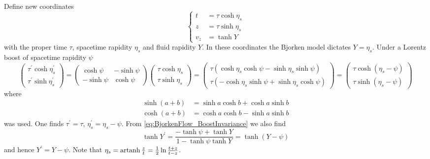 Define new coordinates
\begin{equation}
    \left\{
    \begin{split}
        t&=\tau\cosh\eta_s\\
        z&=\tau\sinh\eta_s\\
        v_z&=\tanh Y
    \end{split}
    \right.
\end{equation}
with the proper time $\tau$, spacetime rapidity $\eta_s$ and fluid rapidity $Y$. In these coordinates the Bjorken model dictates $Y=\eta_s$. Under a Lorentz boost of spacetime rapidity $\psi$
\begin{equation}
    \begin{pmatrix}
        \tau^\prime\cosh\eta_s^\prime \\
        \tau^\prime\sinh\eta_s^\prime
    \end{pmatrix}
    =
    \begin{pmatrix}
        \cosh\psi  & -\sinh\psi \\
        -\sinh\psi & \cosh\psi
    \end{pmatrix}
    \begin{pmatrix}
        \tau\cosh\eta_s \\
        \tau\sinh\eta_s
    \end{pmatrix}
    =
    \begin{pmatrix}
        \tau(\cosh\eta_s\cosh\psi-\sinh\eta_s\sinh\psi) \\
        \tau(-\cosh\eta_s\sinh\psi+\sinh\eta_s\cosh\psi)
    \end{pmatrix}
    =
    \begin{pmatrix}
        \tau\cosh(\eta_s-\psi) \\
        \tau\sinh(\eta_s-\psi)
    \end{pmatrix}
\end{equation}
where
\begin{subequations}
    \begin{align}
        \sinh(a+b) & =\sinh a\cosh b+\cosh a\sinh b \\
        \cosh(a+b) & =\cosh a\cosh b-\sinh a\sinh b
    \end{align}
\end{subequations}
was used. One finds $\tau^\prime=\tau$, $\eta_s^\prime=\eta_s-\psi$. From \eqref{eq:BjorkenFlow_BoostInvariance} we also find
\begin{equation}
    \tanh Y^\prime=\frac{-\tanh\psi+\tanh Y}{1-\tanh\psi \tanh Y}=\tanh(Y-\psi)
\end{equation}
and hence $Y^\prime=Y-\psi$. Note that $\eta_s={\text{artanh}\,}\frac{z}{t}=\frac{1}{2}\ln\frac{t+z}{t-z}$.

